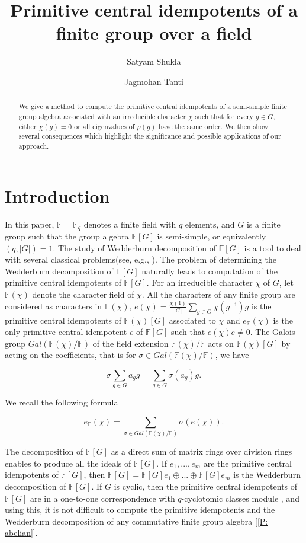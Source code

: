 \documentclass[12pt, reqno]{amsart}
\title{Primitive central idempotents of a finite group over a field}
\author{Satyam Shukla}
\author{Jagmohan Tanti}
\numberwithin{equation}{section}
\theoremstyle{definition}
\theoremstyle{remark}
\theoremstyle{plain}
\begin{document}
\begin{abstract}
We give a method to compute the primitive central idempotents of a semi-simple finite group algebra associated with an irreducible character $\chi$ such that for every $g\in G$, either $\chi(g)=0$ or all eigenvalues of $\rho(g)$ have the same order. We then show several consequences which highlight the significance and possible applications of our approach.
\end{abstract}
\maketitle

\section{Introduction} 
In this paper, $\mathbb{F}=\mathbb{F}_q$ denotes a finite field with $q$ elements, and $G$ is a finite group such that the group algebra $\mathbb{F}[G]$ is semi-simple, or equivalently $(q,|G|)=1$. The study of Wedderburn decomposition of $\mathbb{F}[G]$ is a tool to deal with several classical problems(see, e.g., \cite{Broch}). The problem of determining the Wedderburn decomposition of $\mathbb{F}[G]$ naturally leads to computation of the primitive central idempotents of $\mathbb{F}[G]$. For an irreducible character $\chi$ of $G$, let $\mathbb{F}(\chi)$ denote the character field of $\chi$. All the characters of any finite group are considered as characters in $\mathbb{F}(\chi)$, $e(\chi)=\frac{\chi(1)}{|G|}\sum_{g\in G}\chi(g^{-1})g$ is the primitive central idempotents of $\mathbb{F}(\chi)[G]$ associated to $\chi$ and $e_{\mathbb{F}}(\chi)$ is the only primitive central idempotent $e$ of $\mathbb{F}[G]$ such that $e(\chi)e\neq 0$. The Galois group $Gal(\mathbb{F}(\chi)/\mathbb{F})$ of the field extension $\mathbb{F}(\chi)/\mathbb{F}$ acts on $\mathbb{F}(\chi)[G]$ by acting on the coefficients, that is for $\sigma\in Gal(\mathbb{F}(\chi)/\mathbb{F})$, we have
\begin{center}
  $$\sigma\sum_{g\in G}a_gg=\sum_{g\in G}\sigma(a_g)g.$$
\end{center}
We recall the following formula \cite{T. Yamada}
\begin{center}
$$e_{\mathbb{F}}(\chi)=\sum_{\sigma\in Gal(\mathbb{F}(\chi)/\mathbb{F})}\sigma(e(\chi)).$$  
\end{center}
The decomposition of $\mathbb{F}[G]$ as a direct sum of matrix rings over division rings enables to produce all the ideals of $\mathbb{F}[G]$. If $e_1, ..., e_m$ are the primitive central idempotents of $\mathbb{F}[G]$, then $\mathbb{F}[G]=\mathbb{F}[G]e_1\oplus ...\oplus \mathbb{F}[G]e_m$ is the Wedderburn decomposition of $\mathbb{F}[G]$. If $G$ is cyclic, then the primitive central idempotents of $\mathbb{F}[G]$ are in a one-to-one correspondence with $q$-cyclotomic classes module \cite{V. S. Pless}, and using this, it is not difficult to compute the primitive idempotents and the Wedderburn decomposition of any commutative finite group algebra [\ref{P: abelian}].\smallskip
 
\end{document}
